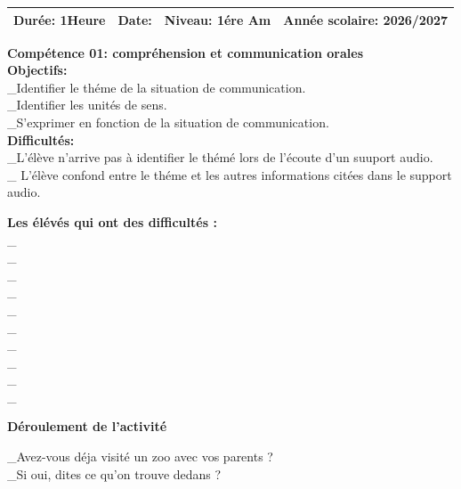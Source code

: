 \documentclass[a4paper,11pt]{article}
\begin{document}

\noindent
\begin{tabularx}{\textwidth}{|p{3cm}|p{3.5cm}|p{3.5cm}|X|}
\hline
Durée: 1Heure & Date: & Niveau: 1ére Am & Année scolaire: 2026/2027 \\
\hline
\end{tabularx}

\vspace{4pt}
\noindent\textbf{Compétence 01: compréhension et communication orales}\\
\textbf{Objectifs:}\\
\_Identifier le théme de la situation de communication.\\
\_Identifier les unités de sens.\\
\_S'exprimer en fonction de la situation de communication.\\
\textbf{Difficultés:}\\
\_L'élève n'arrive pas à identifier le thémé lors de l'écoute d'un suuport audio.\\
\_ L'élève confond entre le théme et les autres informations citées dans le support audio.

\vspace{3pt}
\noindent\textbf{Les élévés qui ont des difficultés :}\\
\_{}\\[-3pt]
\_{}\\[-3pt]
\_{}\\[-3pt]
\_{}\\[-3pt]
\_{}\\[-3pt]
\_{}\\[-3pt]
\_{}\\[-3pt]
\_{}\\[-3pt]
\_{}\\[-3pt]
\_{}

\vspace{-2pt}
\begin{center}
\textbf{Déroulement de l'activité}
\end{center}
\vspace{-4pt}
\_Avez-vous déja visité un zoo avec vos parents ?\\
\_Si oui, dites ce qu'on trouve dedans ?
\end{document}
